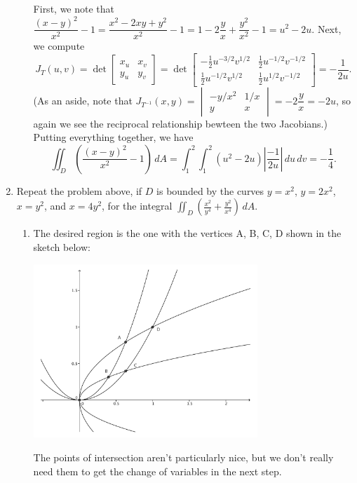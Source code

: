 \documentclass[letterpaper,12pt]{article}
\newcommand{\di}{\displaystyle}
\begin{document}
\begin{enumerate}
\begin{enumerate}
First, we note that $\dfrac{(x-y)^2}{x^2}-1 = \dfrac{x^2-2xy+y^2}{x^2}-1 = 1-2\dfrac{y}{x}+\dfrac{y^2}{x^2}-1 = u^2-2u$. Next, we compute
\[
 J_T(u,v) = \det\begin{bmatrix}x_u&x_v\\y_u&y_v\end{bmatrix} = \det\begin{bmatrix} -\frac{1}{2}u^{-3/2}v^{1/2}& \frac{1}{2}u^{-1/2}v^{-1/2}\\ \frac{1}{2}u^{-1/2}v^{1/2}& \frac{1}{2}u^{1/2}v^{-1/2}\end{bmatrix} = -\frac{1}{2u}.
\]
(As an aside, note that $J_{T^{-1}}(x,y) = \begin{vmatrix} -y/x^2 & 1/x\\y&x\end{vmatrix} = -2\dfrac{y}{x} = -2u$, so again we see the reciprocal relationship bewteen the two Jacobians.) Putting everything together, we have
\[
 \iint_D\left(\frac{(x-y)^2}{x^2}-1\right)\,dA = \int_1^2\int_1^2 (u^2-2u)\left\lvert\frac{-1}{2u}\right\lvert\,du\,dv = -\frac{1}{4}.
\]

\end{enumerate}
\item Repeat the problem above, if $D$ is bounded by the curves $y=x^2$, $y=2x^2$, $x=y^2$, and $x=4y^2$, for the integral $\di \iint_D\left(\frac{x^2}{y^4}+\frac{y^2}{x^4}\right)\,dA$.

\begin{enumerate}
 \item The desired region is the one with the vertices A, B, C, D shown in the sketch below:

\begin{center}
 \includegraphics[width=0.7\textwidth]{Q15-extra2}
\end{center}

The points of intersection aren't particularly nice, but we don't really need them to get the change of variables in the next step.


\end{enumerate}
\end{enumerate}
\end{document}
